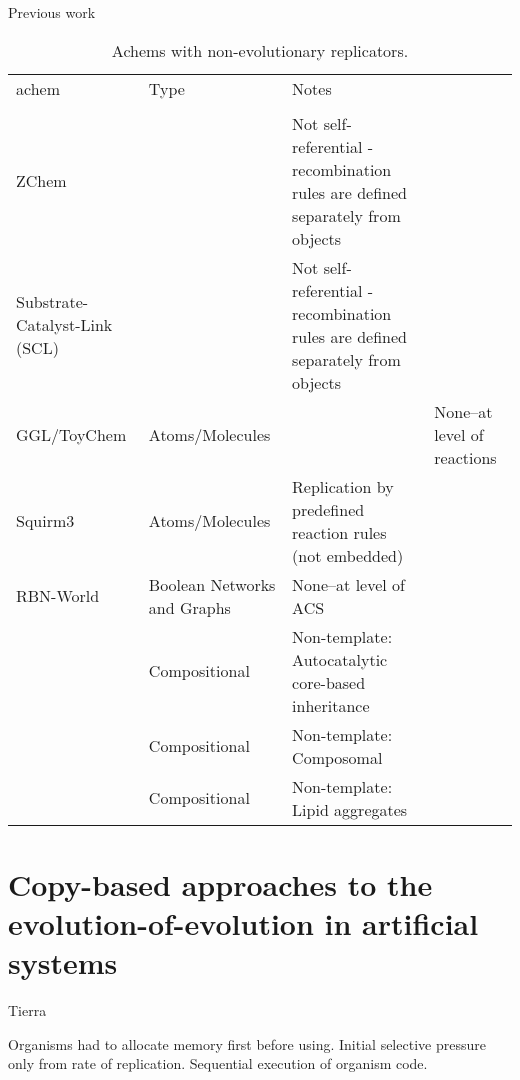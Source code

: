 \begin{sidewaystable}
	\begin{center}
		\scriptsize
		\caption{Previous work}
		\label{tb:previous-work}
		\begin{tabular}{@{}llll@{}}
			\hline\noalign{\smallskip}
			\Gls{achem}                                                     & Type 	& Notes\\ 
			\\ \noalign{\smallskip}
			\hline
			\noalign{\smallskip}			
			ZChem \cite{Tominaga2004}                                     	&&Not self-referential - recombination rules are defined separately from objects\\
			Substrate-Catalyst-Link (SCL) \cite{Varela:1974qd,Suzuki2008} 	&&Not self-referential - recombination rules are defined separately from objects\\
			GGL/ToyChem \cite{Benko2003,Benko2005}                        	&Atoms/Molecules&&None--at level of reactions\\			
			Squirm3 \cite{Hutton2002,Hutton2007,Lucht2012}                	&Atoms/Molecules&Replication by predefined reaction rules (not embedded)&\\
			RBN-World \cite{Faulconbridge2011}                            	&Boolean Networks and Graphs& None--at level of ACS\\
			\cite{Vasas2015, Vasas2012, Vasas2012a}							&Compositional&Non-template: Autocatalytic core-based inheritance\\
			\cite{Segre1998}												&Compositional&Non-template: Composomal\\
			\cite{Fernando:2008xy,Fernando:2007pf}                          &Compositional&Non-template: Lipid aggregates\\
			\hline
		\end{tabular}
	\end{center}
	\caption{Achems with non-evolutionary replicators.}
\end{sidewaystable}

\section{Copy-based approaches to the evolution-of-evolution in artificial systems}

Tierra \parencite{Ray1991}

Organisms had to allocate memory first before using. Initial selective pressure only from rate of replication. Sequential execution of organism code. \parencite{Ofria2004}


